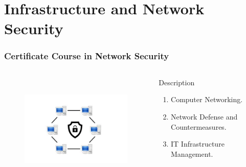 \section{Infrastructure and Network Security}
\begin{frame}
	\frametitle{Certificate Course in Network Security}
		\begin{columns}
		
		
		\begin{figure}
			\includegraphics[width=200pt,height=150pt]{figures/course_ns.jpg}
		\end{figure}
		
		
		\begin{block}{Description}
			
			\begin{enumerate}
				\item Computer Networking.
				\item Network Defense and Countermeasures. 
				\item IT Infrastructure Management.
			\end{enumerate}
			
		\end{block}
		
	\end{columns}
\end{frame}
